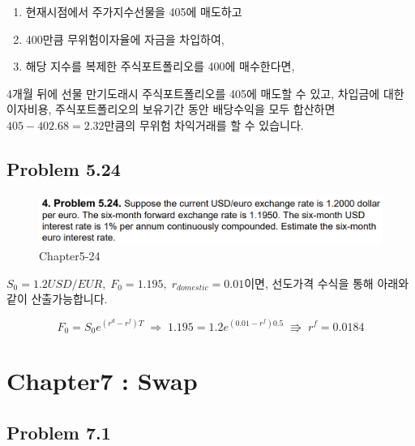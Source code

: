\documentclass[
  letterpaper,
  DIV=11,
  numbers=noendperiod]{scrreprt}
\begin{document}
\begin{enumerate}
\def\labelenumi{(\arabic{enumi})}
\item
  현재시점에서 주가지수선물을 405에 매도하고
\item
  400만큼 무위험이자율에 자금을 차입하여,
\item
  해당 지수를 복제한 주식포트폴리오를 400에 매수한다면,
\end{enumerate}

4개월 뒤에 선물 만기도래시 주식포트폴리오를 405에 매도할 수 있고,
차입금에 대한 이자비용, 주식포트폴리오의 보유기간 동안 배당수익을 모두
합산하면 \(405-402.68=2.32\)만큼의 무위험 차익거래를 할 수 있습니다.

\subsection*{\texorpdfstring{\textbf{Problem
5.24}}{Problem 5.24}}\label{problem-5.24}

\begin{figure}[H]

{\centering \includegraphics{images/선물옵션_5-24.png}

}

\caption{Chapter5-24}

\end{figure}%

\(S_0=1.2USD/EUR,\;F_0=1.195,\;r_{domestic}=0.01\)이면, 선도가격 수식을
통해 아래와 같이 산출가능합니다.

\[F_0=S_0e^{(r^d-r^f)T}\;\Rightarrow\;1.195=1.2e^{(0.01-r^f)0.5}\;\Rrightarrow\;r^f=0.0184\]

\section*{Chapter7 : Swap}\label{chapter7-swap}


\subsection*{\texorpdfstring{\textbf{Problem
7.1}}{Problem 7.1}}\label{problem-7.1}
\end{document}

